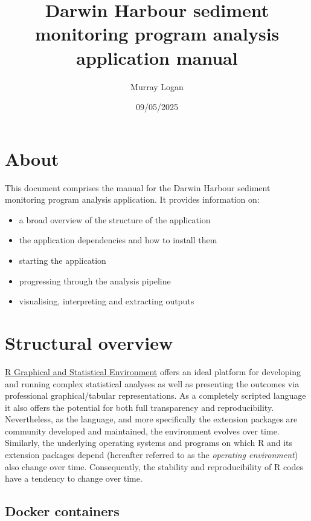 \documentclass[
  8pt,
  a4paper]{article}
\title{Darwin Harbour sediment monitoring program analysis application
manual}
\author{Murray Logan}
\date{09/05/2025}
\providecommand{\tightlist}{%
  \setlength{\itemsep}{0pt}\setlength{\parskip}{0pt}}
\renewcommand*\contentsname{Table of contents}
\newcommand\contentsname{Table of contents}
\begin{document}
\maketitle

\renewcommand*\contentsname{Table of contents}
{
\hypersetup{linkcolor=}
\setcounter{tocdepth}{3}
\tableofcontents
}

\section{About}\label{about}

This document comprises the manual for the Darwin Harbour sediment
monitoring program analysis application. It provides information on:

\begin{itemize}
\tightlist
\item
  a broad overview of the structure of the application
\item
  the application dependencies and how to install them
\item
  starting the application
\item
  progressing through the analysis pipeline
\item
  visualising, interpreting and extracting outputs
\end{itemize}

\section{Structural overview}\label{structural-overview}

\href{https://www.r-project.org/}{R Graphical and Statistical
Environment} offers an ideal platform for developing and running complex
statistical analyses as well as presenting the outcomes via professional
graphical/tabular representations. As a completely scripted language it
also offers the potential for both full transparency and
reproducibility. Nevertheless, as the language, and more specifically
the extension packages are community developed and maintained, the
environment evolves over time. Similarly, the underlying operating
systems and programs on which R and its extension packages depend
(hereafter referred to as the \emph{operating environment}) also change
over time. Consequently, the stability and reproducibility of R codes
have a tendency to change over time.

\subsection{Docker containers}\label{docker-containers}
\end{document}

